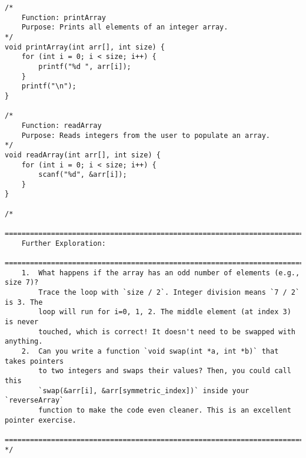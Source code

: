 \documentclass[11pt]{book}
\begin{document}
\begin{verbatim}
/*
    Function: printArray
    Purpose: Prints all elements of an integer array.
*/
void printArray(int arr[], int size) {
    for (int i = 0; i < size; i++) {
        printf("%d ", arr[i]);
    }
    printf("\n");
}

/*
    Function: readArray
    Purpose: Reads integers from the user to populate an array.
*/
void readArray(int arr[], int size) {
    for (int i = 0; i < size; i++) {
        scanf("%d", &arr[i]);
    }
}

/*
    ================================================================================
    Further Exploration:
    ================================================================================
    1.  What happens if the array has an odd number of elements (e.g., size 7)?
        Trace the loop with `size / 2`. Integer division means `7 / 2` is 3. The
        loop will run for i=0, 1, 2. The middle element (at index 3) is never
        touched, which is correct! It doesn't need to be swapped with anything.
    2.  Can you write a function `void swap(int *a, int *b)` that takes pointers
        to two integers and swaps their values? Then, you could call this
        `swap(&arr[i], &arr[symmetric_index])` inside your `reverseArray`
        function to make the code even cleaner. This is an excellent pointer exercise.
    ================================================================================
*/

\end{verbatim}
\end{document}
